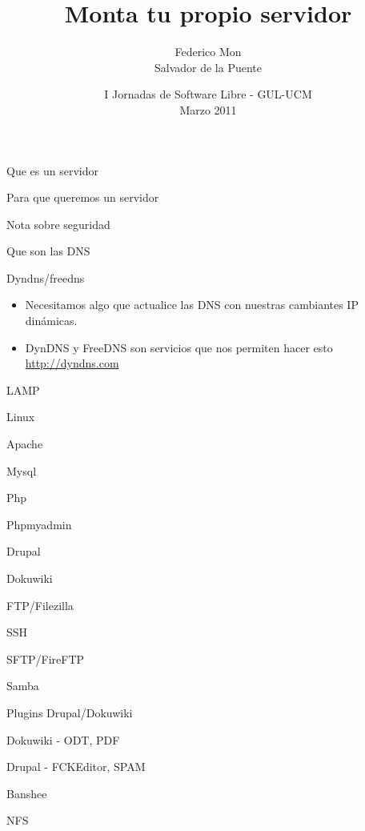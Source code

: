 \documentclass[spanish]{beamer}
\title[Monta tu propio servidor - GUL-UCM]
{Monta tu propio servidor
}
\author[\url{http://gulucm.org}]
{
Federico Mon\\
Salvador de la Puente
}
\institute{Facultad de Informática.\\Universidad Complutense de Madrid.}
\date{
I Jornadas de Software Libre - GUL-UCM\\
Marzo 2011}
\begin{document}
    \frame{\titlepage}
\begin{frame}{Que es un servidor}
\end{frame}
\begin{frame}{Para que queremos un servidor}
\end{frame}
\begin{frame}{Nota sobre seguridad}
\end{frame}
\begin{frame}{Que son las DNS}
\end{frame}
\begin{frame}{Dyndns/freedns}
\begin{itemize}
\item Necesitamos algo que actualice las DNS con nuestras cambiantes IP dinámicas.
\item DynDNS y FreeDNS son servicios que nos permiten hacer esto
\url{http://dyndns.com}
\end{itemize}
\end{frame}
\begin{frame}{LAMP}
\end{frame}
\begin{frame}{Linux}
\end{frame}
\begin{frame}{Apache}
\end{frame}
\begin{frame}{Mysql}
\end{frame}
\begin{frame}{Php}
\end{frame}
\begin{frame}{Phpmyadmin}
\end{frame}
\begin{frame}{Drupal}
\end{frame}
\begin{frame}{Dokuwiki}
\end{frame}
\begin{frame}{FTP/Filezilla}
\end{frame}
\begin{frame}{SSH}
\end{frame}
\begin{frame}{SFTP/FireFTP}
\end{frame}
\begin{frame}{Samba}
\end{frame}
\begin{frame}{Plugins Drupal/Dokuwiki}
\end{frame}
\begin{frame}{Dokuwiki - ODT, PDF}
\end{frame}
\begin{frame}{Drupal - FCKEditor, SPAM}
\end{frame}
\begin{frame}{Banshee}
\end{frame}
\begin{frame}{NFS}
\end{frame}
\end{document}
